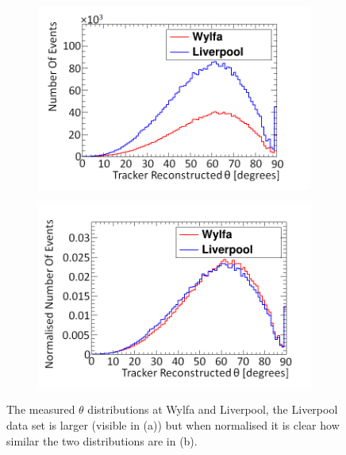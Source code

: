 \begin{figure}[!h]
\centering
\begin{subfigure}{.5\textwidth}
  \centering
  \includegraphics[width=\linewidth]{Chapter6/Figs/Raster/thetaWylfaLiverpoolNewMedText.png}
  \captionsetup{width=.9\linewidth}
  \caption{}
  \label{subFig:measuredThetaWylfaLiv}
\end{subfigure}%
\begin{subfigure}{.5\textwidth}
  \centering
\includegraphics[width=\linewidth]{Chapter6/Figs/Raster/thetaWylfaLiverpoolNewNormMedText.png}
  \captionsetup{width=.9\linewidth}
  \caption{}
  \label{subFig:measuredThetaWylfaLivNorm}
\end{subfigure}
\caption[Measured $\theta$ distributions at Wylfa and Liverpool.]{The measured $\theta$ distributions at Wylfa and Liverpool, the Liverpool data set is larger (visible in (a)) but when normalised it is clear how similar the two distributions are in (b).}
\label{fig:measuredThetaWylfaLiverpool}
\end{figure}

